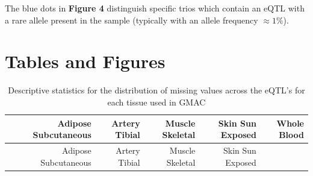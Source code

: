 \documentclass[
]{article}
\begin{document}
The blue dots in \textbf{Figure 4} distinguish specific trios which
contain an eQTL with a rare allele present in the sample (typically with
an allele frequency \(\approx 1\%\)).

\newpage
\section{Tables and Figures}

\begin{longtable}[]{@{}lrrrrr@{}}
\caption{Descriptive statistics for the distribution of missing values
across the eQTL's for each tissue used in GMAC}\tabularnewline
\toprule
\begin{minipage}[b]{0.08\columnwidth}\raggedright
\strut
\end{minipage} & \begin{minipage}[b]{0.20\columnwidth}\raggedleft
Adipose Subcutaneous\strut
\end{minipage} & \begin{minipage}[b]{0.13\columnwidth}\raggedleft
Artery Tibial\strut
\end{minipage} & \begin{minipage}[b]{0.15\columnwidth}\raggedleft
Muscle Skeletal\strut
\end{minipage} & \begin{minipage}[b]{0.16\columnwidth}\raggedleft
Skin Sun Exposed\strut
\end{minipage} & \begin{minipage}[b]{0.11\columnwidth}\raggedleft
Whole Blood\strut
\end{minipage}\tabularnewline
\midrule
\endfirsthead
\toprule
\begin{minipage}[b]{0.08\columnwidth}\raggedright
\strut
\end{minipage} & \begin{minipage}[b]{0.20\columnwidth}\raggedleft
Adipose Subcutaneous\strut
\end{minipage} & \begin{minipage}[b]{0.13\columnwidth}\raggedleft
Artery Tibial\strut
\end{minipage} & \begin{minipage}[b]{0.15\columnwidth}\raggedleft
Muscle Skeletal\strut
\end{minipage} & \begin{minipage}[b]{0.16\columnwidth}\raggedleft
Skin Sun Exposed\strut
\end{minipage} & \begin{minipage}[b]{0.11\columnwidth}\raggedleft

\end{minipage}
\end{longtable}
\end{document}
